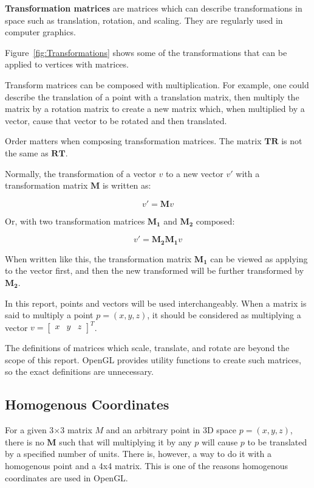 \textbf{Transformation matrices} are matrices which can describe transformations in space such as translation, rotation, and scaling. They are regularly used in computer graphics. 

Figure~\ref{fig:Transformations} shows some of the transformations that can be applied to vertices with matrices.

Transform matrices can be composed with multiplication. For example, one could describe the translation of a point with a translation matrix, then multiply the matrix by a rotation matrix to create a new matrix which, when multiplied by a vector, cause that vector to be rotated and then translated.

Order matters when composing transformation matrices. The matrix $\mathbf{T} \mathbf{R}$ is not the same as $\mathbf{R} \mathbf{T}$.

Normally, the transformation of a vector $v$ to a new vector $v'$ with a transformation matrix $\mathbf{M}$ is written as:

\[ v' = \mathbf{M} v \]

Or, with two transformation matrices $\mathbf{M_1}$ and $\mathbf{M_2}$ composed:

\[ v' = \mathbf{M_2} \mathbf{M_1} v \]

When written like this, the transformation matrix $\mathbf{M_1}$ can be viewed as applying to the vector first, and then the new transformed will be further transformed by $\mathbf{M_2}$.

In this report, points and vectors will be used interchangeably. When a matrix is said to multiply a point $p = (x, y, z)$, it should be considered as multiplying a vector $v = \begin{bmatrix}x & y & z\end{bmatrix}^T $. 

The definitions of matrices which scale, translate, and rotate are beyond the scope of this report. OpenGL provides utility functions to create such matrices, so the exact definitions are unnecessary.

\subsection{Homogenous Coordinates}
For a given 3$\times$3 matrix $M$ and an arbitrary point in 3D space $p = (x, y, z)$, there is no $\mathbf{M}$ such that will multiplying it by any $p$ will cause $p$ to be translated by a specified number of units. There is, however, a way to do it with a homogenous point and a 4x4 matrix. This is one of the reasons homogenous coordinates are used in OpenGL.

